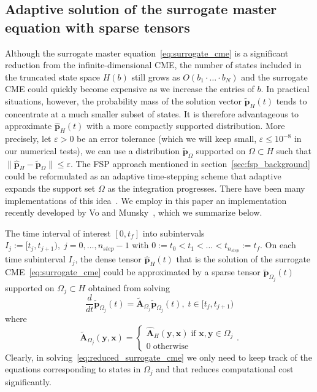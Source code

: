 \documentclass[1p]{article}
\newcommand{\tf}{t_{f}}
\begin{document}
\subsection{Adaptive solution of the surrogate master equation with sparse tensors}
\label{sec:adaptive_fsp}
Although the surrogate master equation~\eqref{eq:surrogate_cme} is a significant reduction from the infinite-dimensional CME, the number of states included in the truncated state space $H(b)$ still grows as $O(b_1\cdot \ldots \cdot b_{N})$ and the surrogate CME could quickly become expensive as we increase the entries of $b$. In practical situations, however, the probability mass of the solution vector $\widetilde{\bm{p}}_{H}(t)$ tends to concentrate at a much smaller subset of states. It is therefore advantageous to approximate $\widehat{\bm{p}}_{H}(t)$ with a more compactly supported distribution.
More precisely, let $\varepsilon > 0$ be an error tolerance (which we will keep small, $\varepsilon \leq 10^{-8}$ in our numerical tests), we can use a distribution $\widetilde{\bm{p}}_{\Omega}$ supported on $\Omega \subset H$ such that $\|\widehat{\bm{p}}_{H} - \widetilde{\bm{p}}_{\Omega}\| \leq \varepsilon$.
The FSP approach mentioned in section~\ref{sec:fsp_background} could be reformulated as an adaptive time-stepping scheme that adaptive expands the support set $\Omega$ as the integration progresses. There have been many implementations of this idea~\cite{Munsky2007, Sidje2006, Wolf2010, Sidje2015}. We employ in this paper an implementation recently developed by Vo and Munsky~\cite{Vo2019parallel}, which we summarize below.

The time interval of interest $[0, \tf]$ into subintervals $I_j := [t_j, t_{j+1}),\; j=0,\ldots,n_{step}-1$
with $0:=t_0 < t_1 < \ldots < t_{n_{step}}:= \tf$.
On each time subinterval $I_j$, the dense tensor $\widehat{\bm{p}}_{H}(t)$ that is the solution of the surrogate CME~\eqref{eq:surrogate_cme} could be approximated by a sparse tensor $\widetilde{\bm{p}}_{\Omega_j}(t)$ supported on $\Omega_j \subset H$ obtained from solving
\begin{equation}
  \label{eq:reduced_surrogate_cme}
  \frac{d}{dt}{\widetilde{\bm{p}}_{\Omega_j}}(t)
  =
  \widetilde{\bm{A}}_{\Omega_j}\widetilde{\bm{p}}_{\Omega_j}(t),
  \;
  t \in [t_j, t_{j+1})
\end{equation}
where
$$
\widetilde{\bm{A}}_{\Omega_j}(\bm{y}, \bm{x}) =
\begin{cases}
  \widehat{\bm{A}}_{H}(\bm{y}, \bm{x}) \; \text{if } \bm{x}, \bm{y} \in \Omega_j \\
  0 \; \text{otherwise}
\end{cases}
.
$$
Clearly, in solving~\eqref{eq:reduced_surrogate_cme} we only need to keep track of the equations corresponding to states in $\Omega_j$ and that reduces computational cost significantly.
\end{document}
